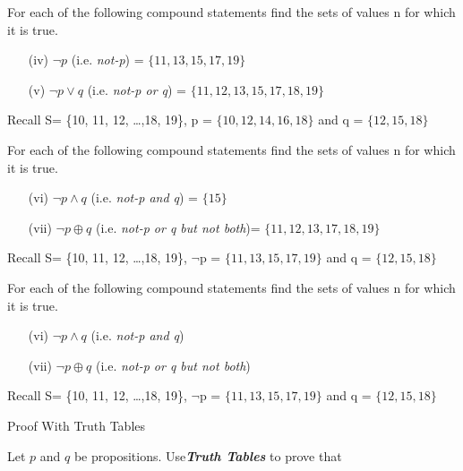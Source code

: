 \documentclass[12pt]{article}
\begin{document}
For each of the following compound statements find the sets of values n for which it is true. %
\begin{itemize}
\item[(iv)] $\neg p $  (i.e. \textit{not-p}) = $\{ 11, 13, 15, 17, 19\}$
\item[(v)] $\neg p \vee q$  (i.e. \textit{not-p or q}) =  $\{11, 12, 13, 15, 17, 18, 19\}$
\end{itemize}

Recall S= \{10, 11, 12, \ldots ,18, 19\}, p = $\{10,12,14,16,18\}$  and q = $\{12,15,18\}$



For each of the following compound statements find the sets of values n for which it is true. 
\begin{itemize}
\item[(vi)] $\neg p \wedge q$ (i.e. \textit{not-p and q}) = $\{15\} $
\item[(vii)] $ \neg p \oplus q$ (i.e. \textit{ not-p or q but not both})= $\{11, 12, 13, 17, 18, 19\}$
\end{itemize}

Recall S= \{10, 11, 12, \ldots ,18, 19\}, $\neg$p = $\{ 11, 13, 15, 17, 19\}$  and q = $\{12,15,18\}$

For each of the following compound statements find the sets of values n for which it is true. 
\begin{itemize}
\item[(vi)] $\neg p \wedge q$ (i.e. \textit{not-p and q}) %
\item[(vii)] $ \neg p \oplus q$ (i.e. \textit{ not-p or q but not both}) %
\end{itemize}

Recall S= \{10, 11, 12, \ldots ,18, 19\}, $\neg$p = $\{ 11, 13, 15, 17, 19\}$  and q = $\{12,15,18\}$


{Proof With Truth Tables}

Let $p$ and $q$ be propositions. Use\textbf{\textit{Truth Tables}} to prove that
\end{document}
